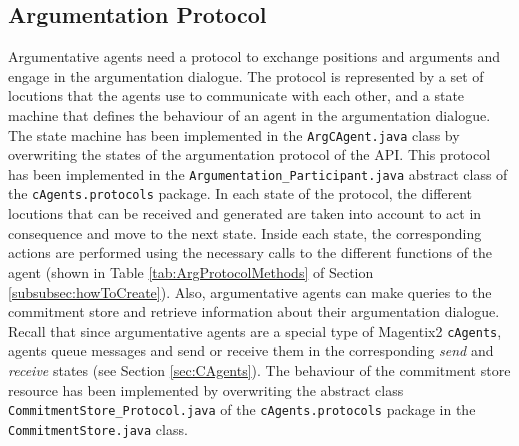 \subsection{Argumentation Protocol}
Argumentative agents need a protocol to exchange positions and arguments and engage in the argumentation dialogue. The protocol is represented by a set of locutions that the agents use to communicate with each other, and a state machine that defines the behaviour of an agent in the argumentation dialogue. The state machine has been implemented in the \lstinline{ArgCAgent.java} class by overwriting the states of the argumentation protocol of the API. This protocol has been implemented in the \lstinline{Argumentation_Participant.java} abstract class of the \lstinline{cAgents.protocols} package. In each state of the protocol, the different locutions that can be received and generated are taken into account to act in consequence and move to the next state. Inside each state, the corresponding actions are performed using the necessary calls to the different functions of the agent (shown in Table \ref{tab:ArgProtocolMethods} of Section \ref{subsubsec:howToCreate}). Also, argumentative agents can make queries to the commitment store and retrieve information about their argumentation dialogue. Recall that since argumentative agents are a special type of Magentix2 \texttt{cAgents}, agents queue messages and send or receive them in the corresponding \textit{send} and \textit{receive} states (see Section \ref{sec:CAgents}). The behaviour of the commitment store resource has been implemented by overwriting the abstract class \lstinline{CommitmentStore_Protocol.java} of the \lstinline{cAgents.protocols} package in the \lstinline{CommitmentStore.java} class.

